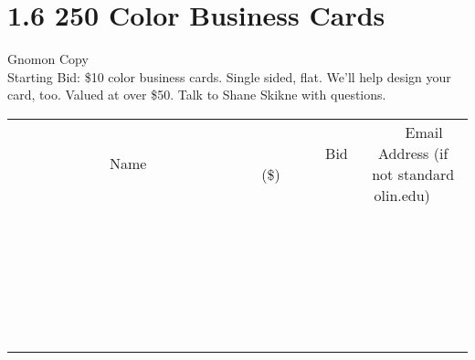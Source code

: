 \documentclass[11pt]{article}
\begin{document}
\section*{1.6 250 Color Business Cards}
Gnomon Copy
\\
Starting Bid: \$10
 color business cards. Single sided, flat. We'll help design your card, too. Valued at over \$50. Talk to Shane Skikne with questions.
\\[6ex]
\begin{tabular}{c c c}
~~~~~~~~~~~~~Name~~~~~~~~~~~~~ & ~~~~~~~~~Bid (\$)~~~~~~~~~  & ~~~Email Address (if not standard olin.edu)~~~\\
 & & \\
\hline
 & & \\
\hline
 & & \\
\hline
 & & \\
\hline
 & & \\
\hline
 & & \\
\hline
 & & \\
\hline
 & & \\
\hline
 & & \\
\hline
 & & \\
\hline
 & & \\
\hline
 & & \\
\hline
 & & \\
\hline
 & & \\
\hline
 & & \\
\hline
 & & \\
\hline
 & & \\
\hline
 & & \\
\hline
 & & \\
\hline
 & & \\
\hline
 & & \\
\hline
 & & \\
\hline
 & & \\
\hline
 & & \\
\hline
 & & \\
\hline
 & & \\
\hline
\end{tabular}
\newpage
\end{document}
